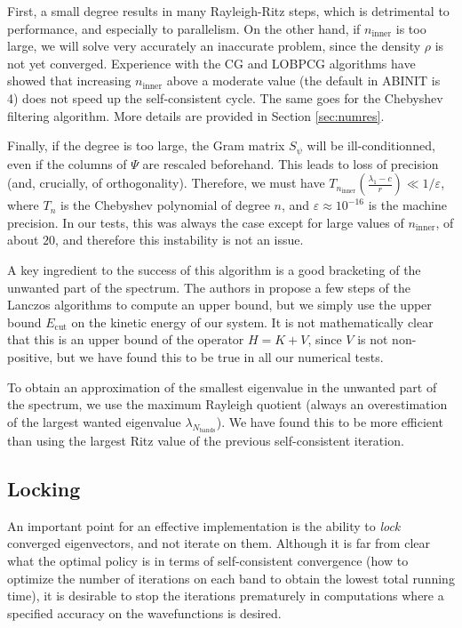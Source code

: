 \documentclass[11pt]{elsarticle}
\newcommand{\nline}{\ensuremath{n_{\text{inner}}}\xspace}
\newcommand{\nband}{\ensuremath{N_{\text{bands}}}\xspace}
\begin{document}
First, a small degree results in many Rayleigh-Ritz steps, which is
detrimental to performance, and especially to parallelism. On the
other hand, if $\nline$ is too large, we will solve very accurately an
inaccurate problem, since the density $\rho$ is not yet
converged. Experience with the CG and LOBPCG algorithms have showed
that increasing $\nline$ above a moderate value (the default in ABINIT
is 4) does not speed up the self-consistent cycle. The same goes for
the Chebyshev filtering algorithm. More details are provided in
Section \ref{sec:numres}.

Finally, if the degree is too large, the Gram matrix $S_{\psi}$ will
be ill-conditionned, even if the columns of $\Psi$ are rescaled
beforehand. This leads to loss of precision (and, crucially, of
orthogonality). Therefore, we must have $T_{\nline}(\frac{\lambda_{1}
  - c}r) \ll 1/\varepsilon$, where $T_{n}$ is the Chebyshev polynomial
of degree $n$, and $\varepsilon \approx 10^{-16}$ is the machine
precision. In our tests, this was always the case except for large
values of $\nline$, of about $20$, and therefore this instability is
not an issue.

A key ingredient to the success of this algorithm is a good bracketing
of the unwanted part of the spectrum. The authors in \cite{seq_chebfi}
propose a few steps of the Lanczos algorithms to compute an upper
bound, but we simply use the upper bound $E_{\text{cut}}$ on the
kinetic energy of our system. It is not mathematically clear that this
is an upper bound of the operator $H = K + V$, since $V$ is not
non-positive, but we have found this to be true in all our numerical
tests.

To obtain an approximation of the smallest eigenvalue in the unwanted
part of the spectrum, we use the maximum Rayleigh quotient (always an
overestimation of the largest wanted eigenvalue
$\lambda_{\nband}$). We have found this to be more efficient than
using the largest Ritz value of the previous self-consistent iteration.

\subsection{Locking}
An important point for an effective implementation is the ability to
\textit{lock} converged eigenvectors, and not iterate on
them. Although it is far from clear what the optimal policy is in
terms of self-consistent convergence (how to optimize the number of iterations on
each band to obtain the lowest total running time), it is desirable to
stop the iterations prematurely in computations where a specified
accuracy on the wavefunctions is desired.
\end{document}
